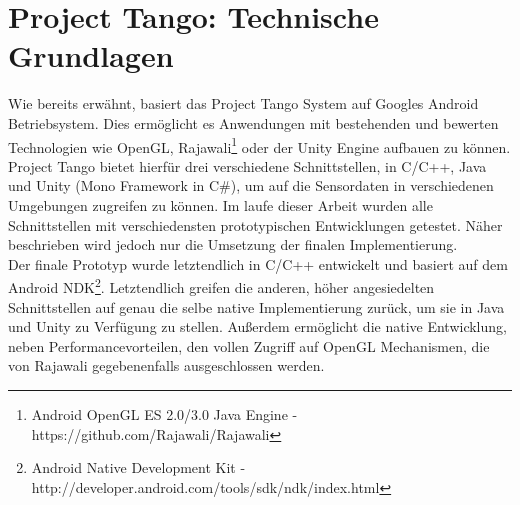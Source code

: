 \section{Project Tango: Technische Grundlagen}

Wie bereits erwähnt, basiert das Project Tango System auf Googles Android Betriebsystem. Dies ermöglicht es Anwendungen mit bestehenden und bewerten Technologien wie OpenGL, Rajawali\footnote{Android OpenGL ES 2.0/3.0 Java Engine - https://github.com/Rajawali/Rajawali} oder der Unity Engine aufbauen zu können. Project Tango bietet hierfür drei verschiedene Schnittstellen, in C/C++, Java und Unity (Mono Framework in C\#), um auf die Sensordaten in verschiedenen Umgebungen zugreifen zu können. Im laufe dieser Arbeit wurden alle Schnittstellen mit verschiedensten prototypischen Entwicklungen getestet. Näher beschrieben wird jedoch nur die Umsetzung der finalen Implementierung.\\

Der finale Prototyp wurde letztendlich in C/C++ entwickelt und basiert auf dem Android NDK\footnote{Android Native Development Kit - http://developer.android.com/tools/sdk/ndk/index.html}. Letztendlich greifen die anderen, höher angesiedelten Schnittstellen auf genau die selbe native Implementierung zurück, um sie in Java und Unity zu Verfügung zu stellen. Außerdem ermöglicht die native Entwicklung, neben Performancevorteilen, den vollen Zugriff auf OpenGL Mechanismen, die von Rajawali gegebenenfalls ausgeschlossen werden.\\

